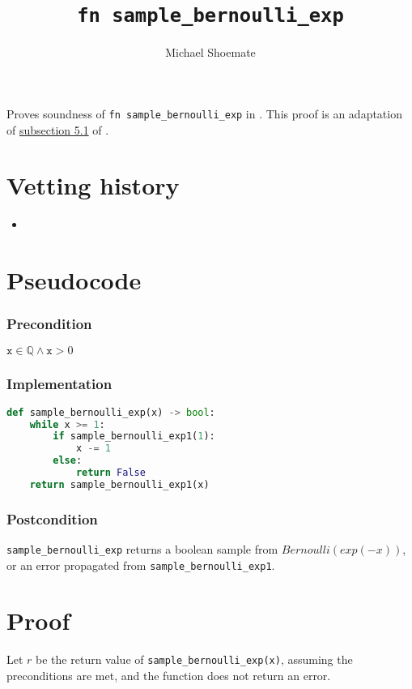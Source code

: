\documentclass{article}
\title{\texttt{fn sample\_bernoulli\_exp}}
\author{Michael Shoemate}
\begin{document}
\maketitle

\contrib
Proves soundness of \texttt{fn sample\_bernoulli\_exp} in .
This proof is an adaptation of \href{https://arxiv.org/pdf/2004.00010.pdf#subsection.5.1}{subsection 5.1} of \cite{CKS20}.

\section{Vetting history}
\begin{itemize}
    \item {}
\end{itemize}

\section{Pseudocode}
\subsubsection*{Precondition}
$\texttt{x} \in \mathbb{Q} \land \texttt{x} > 0$

\subsubsection*{Implementation}        
\begin{lstlisting}[language=Python]
def sample_bernoulli_exp(x) -> bool:
    while x >= 1:
        if sample_bernoulli_exp1(1):
            x -= 1
        else: 
            return False
    return sample_bernoulli_exp1(x)
\end{lstlisting}

\subsubsection*{Postcondition}
\texttt{sample\_bernoulli\_exp} returns a boolean sample from $Bernoulli(exp(-x))$, or an error propagated from \texttt{sample\_bernoulli\_exp1}.

\section{Proof}

Let $r$ be the return value of \texttt{sample\_bernoulli\_exp(x)}, assuming the preconditions are met, and the function does not return an error.
\end{document}
